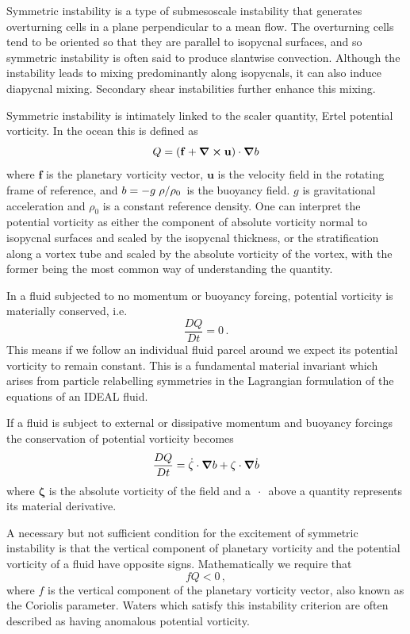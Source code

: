Symmetric instability is a type of submesoscale instability that generates overturning cells in a plane perpendicular to a mean flow. The overturning cells tend to be oriented so that they are parallel to isopycnal surfaces, and so symmetric instability is often said to produce slantwise convection. Although the instability leads to mixing predominantly along isopycnals, it can also induce diapycnal mixing. Secondary shear instabilities further enhance this mixing.

Symmetric instability is intimately linked to the scaler quantity, Ertel potential vorticity. In the ocean this is defined as
\begin{equation}
    Q = (\mathbf{f} + \curl{\mathbf{u}})\cdot\grad b    
\end{equation}
where $\mathbf{f}$ is the planetary vorticity vector, $\mathbf{u}$ is the velocity field in the rotating frame of reference, and $b = -  g \flatfrac{\rho}{\rho_0}$ is the buoyancy field. $g$ is gravitational acceleration and $\rho_0$ is a constant reference density. One can interpret the potential vorticity as either the component of absolute vorticity normal to isopycnal surfaces and scaled by the isopycnal thickness, or the stratification along a vortex tube and scaled by the absolute vorticity of the vortex, with the former being the most common way of understanding the quantity.

In a fluid subjected to no momentum or buoyancy forcing, potential vorticity is materially conserved, i.e.
\begin{equation}
    \frac{DQ}{Dt} = 0 \, .
\end{equation}
This means if we follow an individual fluid parcel around we expect its potential vorticity to remain constant. This is a fundamental material invariant which arises from particle relabelling symmetries in the Lagrangian formulation of the equations of an IDEAL fluid.

If a fluid is subject to external or dissipative momentum and buoyancy forcings the conservation of potential vorticity  becomes
\begin{equation}
    \frac{DQ}{Dt} = \dot{\mathbf{\zeta}} \cdot  \grad{b} + \mathbf{\zeta} \cdot \grad{\dot{b}}
\end{equation}
where $\mathbf{\zeta}$ is the absolute vorticity of the field and a $\,\cdot{}\,$ above a quantity represents its material derivative.

A necessary but not sufficient condition for the excitement of symmetric instability is that the vertical component of planetary vorticity and the potential vorticity of a fluid have opposite signs. Mathematically we require that
\begin{equation}
    \label{eq:PVConservation}
    f Q < 0 \, ,
\end{equation}
where $f$ is the vertical component of the planetary vorticity vector, also known as the Coriolis parameter. Waters which satisfy this instability criterion are often described as having anomalous potential vorticity.

